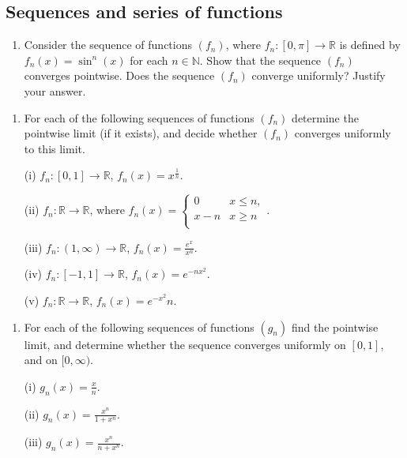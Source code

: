 \documentclass[letterpaper,10pt,english]{jupyterBook}
\begin{document}
\subsection{Sequences and series of functions}
\label{\detokenize{Problems:sequences-and-series-of-functions}}\label{\detokenize{Problems:ch5prob}}\label{\detokenize{Problems:id54}}\begin{enumerate}
%
\setcounter{enumi}{53}
\item {} 
\sphinxAtStartPar
Consider the sequence of functions  \((f_n)\), where \(f_n:[0,\pi ]\to \mathbb{R}\) is defined by \(f_n(x) = \sin^n (x)\) for each \(n\in\mathbb{N}\). Show that the sequence \((f_n)\) converges pointwise. Does the sequence \((f_n)\)  converge uniformly? Justify your answer.

\end{enumerate}
\label{\detokenize{Problems:id55}}\begin{enumerate}
%
\setcounter{enumi}{54}
\item {} 
\sphinxAtStartPar
For each of the following sequences of functions \((f_n)\) determine the pointwise limit (if it exists), and decide whether \((f_n)\) converges uniformly to this limit.

\sphinxAtStartPar
(i) \(f_n:[0,1]\to\mathbb{R}\), \(f_n (x) = x^{\frac{1}{n}}\).

\sphinxAtStartPar
(ii) \(f_n:\mathbb{R}\to\mathbb{R}\), where \(\displaystyle f_n (x)  = \left\{ \begin{array}{ll} 0 & x\leq n, \\ x-n & x\geq n \\ \end{array} \right.\).

\sphinxAtStartPar
(iii) \(f_n:(1,\infty)\to\mathbb{R}\), \(f_n(x) = \frac{e^x}{x^n}\).

\sphinxAtStartPar
(iv) \(f_n:[-1,1]\to\mathbb{R}\), \(f_n(x) = e^{-nx^2}\).

\sphinxAtStartPar
(v) \(f_n:\mathbb{R}\to\mathbb{R}\), \(f_n(x) = e^{-x^2}{n}\).

\end{enumerate}
\label{\detokenize{Problems:id56}}\begin{enumerate}
%
\setcounter{enumi}{55}
\item {} 
\sphinxAtStartPar
For each of the following sequences of functions \((g_n)\) find the pointwise limit, and determine whether the sequence converges uniformly on \([0,1]\), and on \([0,\infty)\).

\sphinxAtStartPar
(i) \(\displaystyle g_n(x) = \frac{x}{n}\).

\sphinxAtStartPar
(ii) \(\displaystyle g_n(x) = \frac{x^n}{1+x^n}\).

\sphinxAtStartPar
(iii) \(\displaystyle g_n (x) = \frac{x^n}{n+x^n}\).

\end{enumerate}
\end{document}

